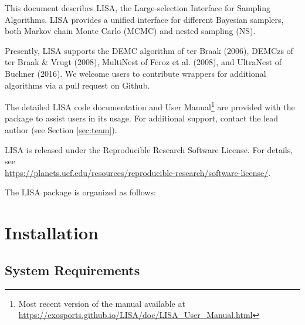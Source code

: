 \documentclass[letterpaper, 12pt]{article}
\begin{document}
\noindent This document describes LISA, the Large-selection Interface for 
Sampling Algorithms.  LISA provides a unified interface for different 
Bayesian samplers, both Markov chain Monte Carlo (MCMC) and nested sampling 
(NS).  \newline

\noindent Presently, LISA supports the DEMC algorithm of ter Braak (2006), DEMCzs of 
ter Braak \& Vrugt (2008), MultiNest of Feroz et al. (2008), and UltraNest of 
Buchner (2016).  We welcome users to contribute wrappers for additional 
algorithms via a pull request on Github. \newline

\noindent The detailed LISA code documentation and User Manual\footnote{Most recent version of the manual available at 
\href{https://exosports.github.io/LISA/doc/LISA_User_Manual.html}{https://exosports.github.io/LISA/doc/LISA\_User\_Manual.html}} 
are provided with the package to assist users in its usage. 
For additional support, contact the lead author (see Section \ref{sec:team}). \newline

\noindent LISA is released under the Reproducible Research Software License.  
For details, see \\
\href{https://planets.ucf.edu/resources/reproducible-research/software-license/}{https://planets.ucf.edu/resources/reproducible-research/software-license/}.\newline

\noindent The LISA package is organized as follows: \newline
\noindent{}
\vspace{0.7cm}

\section{Installation}
\label{sec:installation}

\subsection{System Requirements}
\label{sec:requirements}
\end{document}
